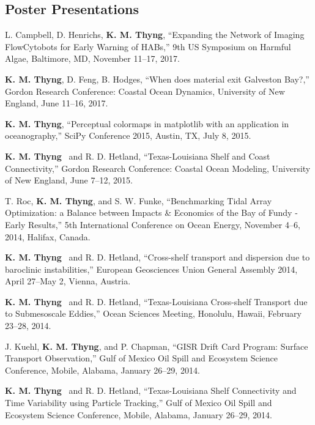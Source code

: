 \documentclass[10pt,letterpaper]{article}
\newcommand{\kmt}{\textbf{K. M. Thyng}}
\renewenvironment{itemize}{
  \begin{list}{}{
    \setlength{\leftmargin}{1.5em}
    \setlength{\itemsep}{0.25em}
    \setlength{\parskip}{0pt}
    \setlength{\parsep}{0.25em}
  }
}{
  \end{list}
}
\begin{document}
\subsection*{Poster Presentations}

\begin{itemize}

\item L. Campbell, D. Henrichs, \kmt, ``Expanding the Network of Imaging FlowCytobots for Early Warning of HABs,'' 9th US Symposium on Harmful Algae, Baltimore, MD, November 11--17, 2017.

\item \kmt, D. Feng, B. Hodges, ``When does material exit Galveston Bay?,'' Gordon Research Conference: Coastal Ocean Dynamics, University of New England, June 11--16, 2017.

\item \kmt, ``Perceptual colormaps in matplotlib with an application in oceanography,'' SciPy Conference 2015, Austin, TX, July 8, 2015.

\item \kmt~ and R. D. Hetland, ``Texas-Louisiana Shelf and Coast Connectivity,'' Gordon Research Conference: Coastal Ocean Modeling, University of New England, June 7--12, 2015.

\item T. Roc, \kmt, and S. W. Funke, ``Benchmarking Tidal Array Optimization: a Balance between Impacts \& Economics of the Bay of Fundy - Early Results,'' 5th International Conference on Ocean Energy, November 4--6, 2014, Halifax, Canada.

\item \kmt~ and R. D. Hetland, ``Cross-shelf transport and dispersion due to baroclinic instabilities,'' European Geosciences Union General Assembly 2014, April 27--May 2, Vienna, Austria.

\item \kmt~ and R. D. Hetland, ``Texas-Louisiana Cross-shelf Transport due to Submesoscale Eddies,'' Ocean Sciences Meeting, Honolulu, Hawaii, February 23--28, 2014.

\item J. Kuehl, \kmt, and P. Chapman, ``GISR Drift Card Program: Surface Transport Observation,'' Gulf of Mexico Oil Spill and Ecosystem Science Conference, Mobile, Alabama, January 26--29, 2014.

\item \kmt~ and R. D. Hetland, ``Texas-Louisiana Shelf Connectivity and Time Variability using Particle Tracking,'' Gulf of Mexico Oil Spill and Ecosystem Science Conference, Mobile, Alabama, January 26--29, 2014.


\end{itemize}
\end{document}
